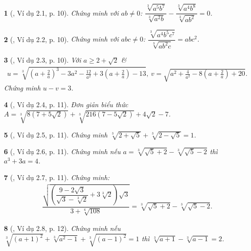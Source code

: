 \documentclass{article}
\newtheorem{baitoan}{}%
\begin{document}
\begin{baitoan}[\cite{TLCT_THCS_Toan_9_dai_so}, Ví dụ 2.1, p. 10]
	Chứng minh với $ab\ne0$: $\dfrac{\sqrt[3]{a^5b^7}}{\sqrt[3]{a^2b}} - \dfrac{\sqrt[3]{a^4b^8}}{\sqrt[3]{ab^2}} = 0$.
\end{baitoan}

\begin{baitoan}[\cite{TLCT_THCS_Toan_9_dai_so}, Ví dụ 2.2, p. 10]
	Chứng minh với $abc\ne0$: $\dfrac{\sqrt[3]{a^4b^5c^7}}{\sqrt[3]{ab^2c}} = abc^2$.
\end{baitoan}

\begin{baitoan}[\cite{TLCT_THCS_Toan_9_dai_so}, Ví dụ 2.3, p. 10]
	Với $a\ge2 + \sqrt{2}$ \&
	\begin{align*}
		u = \sqrt[3]{\left(a + \frac{2}{a}\right)^3 - 3a^2 - \frac{12}{a^2} + 3\left(a + \frac{2}{a}\right) - 13},\ v = \sqrt{a^2 + \frac{4}{a^2} - 8\left(a + \frac{2}{a}\right) + 20}.
	\end{align*}
	Chứng minh $u - v = 3$.
\end{baitoan}

\begin{baitoan}[\cite{TLCT_THCS_Toan_9_dai_so}, Ví dụ 2.4, p. 11]
	Đơn giản biểu thức $A = \sqrt[3]{8(7 + 5\sqrt{2})} + \sqrt[3]{216(7 - 5\sqrt{2})} + 4\sqrt{2} - 7$.
\end{baitoan}

\begin{baitoan}[\cite{TLCT_THCS_Toan_9_dai_so}, Ví dụ 2.5, p. 11]
	Chứng minh $\sqrt[3]{2 + \sqrt{5}} + \sqrt[3]{2 - \sqrt{5}} = 1$.
\end{baitoan}

\begin{baitoan}[\cite{TLCT_THCS_Toan_9_dai_so}, Ví dụ 2.6, p. 11]
	Chứng minh nếu $a = \sqrt[3]{\sqrt{5} + 2} - \sqrt[3]{\sqrt{5} - 2}$ thì $a^3 + 3a = 4$.
\end{baitoan}

\begin{baitoan}[\cite{TLCT_THCS_Toan_9_dai_so}, Ví dụ 2.7, p. 11]
	Chứng minh:
	\begin{align*}
		\dfrac{\sqrt{\left(\dfrac{9 - 2\sqrt{3}}{\sqrt{3} - \sqrt[3]{2}} + 3\sqrt[3]{2}\right)\sqrt{3}}}{3 + \sqrt[6]{108}} = \sqrt[3]{\sqrt{5} + 2} - \sqrt[3]{\sqrt{5} - 2}.
	\end{align*}
\end{baitoan}

\begin{baitoan}[\cite{TLCT_THCS_Toan_9_dai_so}, Ví dụ 2.8, p. 12]
	Chứng minh nếu $\sqrt[3]{(a + 1)^2} + \sqrt[3]{a^2 - 1} + \sqrt[3]{(a - 1)^2} = 1$ thì $\sqrt[3]{a + 1} - \sqrt[3]{a - 1} = 2$.
\end{baitoan}
\end{document}
